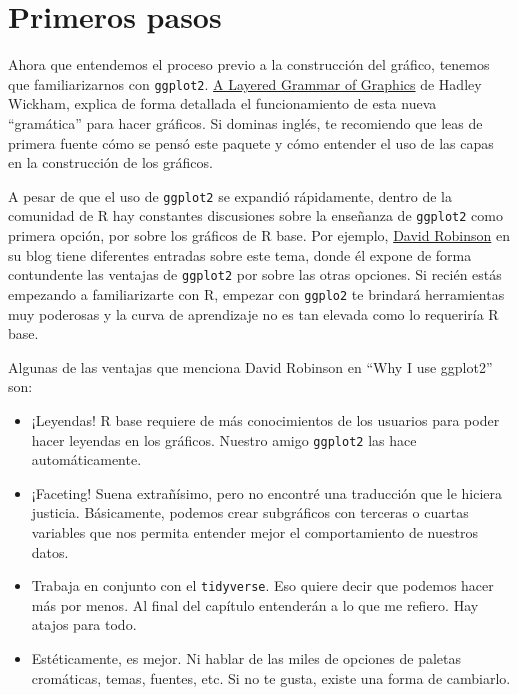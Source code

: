 \documentclass[]{book}
\providecommand{\tightlist}{%
  \setlength{\itemsep}{0pt}\setlength{\parskip}{0pt}}
\begin{document}
\hypertarget{primeros-pasos}{%
\section{Primeros pasos}\label{primeros-pasos}}

Ahora que entendemos el proceso previo a la construcción del gráfico,
tenemos que familiarizarnos con \texttt{ggplot2}.
\href{https://byrneslab.net/classes/biol607/readings/wickham_layered-grammar.pdf}{A
Layered Grammar of Graphics} de Hadley Wickham, explica de forma
detallada el funcionamiento de esta nueva ``gramática'' para hacer
gráficos. Si dominas inglés, te recomiendo que leas de primera fuente
cómo se pensó este paquete y cómo entender el uso de las capas en la
construcción de los gráficos.

A pesar de que el uso de \texttt{ggplot2} se expandió rápidamente,
dentro de la comunidad de R hay constantes discusiones sobre la
enseñanza de \texttt{ggplot2} como primera opción, por sobre los
gráficos de R base. Por ejemplo,
\href{http://varianceexplained.org/r/why-I-use-ggplot2/}{David Robinson}
en su blog tiene diferentes entradas sobre este tema, donde él expone de
forma contundente las ventajas de \texttt{ggplot2} por sobre las otras
opciones. Si recién estás empezando a familiarizarte con R, empezar con
\texttt{ggplo2} te brindará herramientas muy poderosas y la curva de
aprendizaje no es tan elevada como lo requeriría R base.

Algunas de las ventajas que menciona David Robinson en ``Why I use
ggplot2'' son:

\begin{itemize}
\tightlist
\item
  ¡Leyendas! R base requiere de más conocimientos de los usuarios para
  poder hacer leyendas en los gráficos. Nuestro amigo \texttt{ggplot2}
  las hace automáticamente.
\item
  ¡Faceting! Suena extrañísimo, pero no encontré una traducción que le
  hiciera justicia. Básicamente, podemos crear subgráficos con terceras
  o cuartas variables que nos permita entender mejor el comportamiento
  de nuestros datos.
\item
  Trabaja en conjunto con el \texttt{tidyverse}. Eso quiere decir que
  podemos hacer más por menos. Al final del capítulo entenderán a lo que
  me refiero. Hay atajos para todo.
\item
  Estéticamente, es mejor. Ni hablar de las miles de opciones de paletas
  cromáticas, temas, fuentes, etc. Si no te gusta, existe una forma de
  cambiarlo.
\end{itemize}
\end{document}

